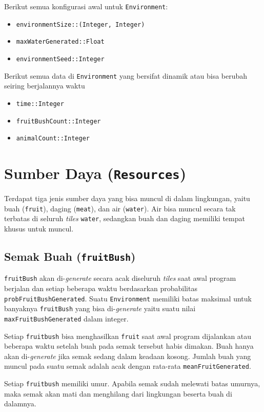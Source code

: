 \documentclass[12pt]{article}
\begin{document}
\noindent Berikut semua konfigurasi awal untuk \texttt{Environment}:
\begin{itemize}
    \item \texttt{environmentSize::(Integer, Integer)}
    \item \texttt{maxWaterGenerated::Float}
    \item \texttt{environmentSeed::Integer}
\end{itemize}

\noindent Berikut semua data di \texttt{Environment} yang bersifat dinamik atau bisa berubah seiring berjalannya waktu
\begin{itemize}
    \item \texttt{time::Integer}
    \item \texttt{fruitBushCount::Integer}
    \item \texttt{animalCount::Integer}
\end{itemize}
\section{Sumber Daya (\texttt{Resources})}
Terdapat tiga jenis sumber daya yang bisa muncul di dalam lingkungan, yaitu buah (\texttt{fruit}), daging (\texttt{meat}), dan air (\texttt{water}). Air bisa muncul secara tak terbatas di seluruh \textit{tiles} \texttt{water}, sedangkan buah dan daging memiliki tempat khusus untuk muncul.

\subsection{Semak Buah (\texttt{fruitBush})}
\texttt{fruitBush} akan di-\textit{generate} secara acak diseluruh \textit{tiles} saat awal program berjalan dan setiap beberapa waktu berdasarkan probabilitas \texttt{probFruitBushGenerated}. Suatu \texttt{Environment} memiliki batas maksimal untuk banyaknya \texttt{fruitBush} yang bisa di-\textit{generate} yaitu suatu nilai \texttt{maxFruitBushGenerated} dalam integer.

\noindent Setiap \texttt{fruitbush} bisa menghasilkan \texttt{fruit} saat awal program dijalankan atau beberapa waktu setelah buah pada semak tersebut habis dimakan. Buah hanya akan di-\textit{generate} jika semak sedang dalam keadaan kosong. Jumlah buah yang muncul pada suatu semak adalah acak dengan rata-rata \texttt{meanFruitGenerated}.

\noindent Setiap \texttt{fruitbush} memiliki umur. Apabila semak sudah melewati batas umurnya, maka semak akan mati dan menghilang dari lingkungan beserta buah di dalamnya.
\end{document}
